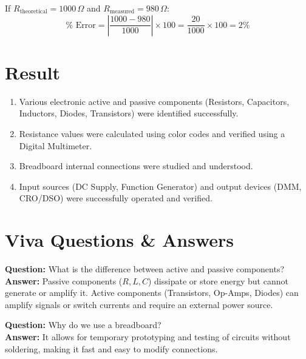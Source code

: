 \begin{example}
If $R_{\text{theoretical}} = 1000\,\Omega$ and $R_{\text{measured}} = 980\,\Omega$:
\begin{equation*}
    \% \text{ Error} = \left| \frac{1000 - 980}{1000} \right| \times 100 = \frac{20}{1000} \times 100 = 2\%
\end{equation*}
\end{example}

\section{Result}
\begin{enumerate}
    \item Various electronic active and passive components (Resistors, Capacitors, Inductors, Diodes, Transistors) were identified successfully.
    \item Resistance values were calculated using color codes and verified using a Digital Multimeter.
    \item Breadboard internal connections were studied and understood.
    \item Input sources (DC Supply, Function Generator) and output devices (DMM, CRO/DSO) were successfully operated and verified.
\end{enumerate}

\section{Viva Questions \& Answers}

\begin{vivaqa}
\textbf{Question:} What is the difference between active and passive components?\\[4pt]
\textbf{Answer:} Passive components ($R, L, C$) dissipate or store energy but cannot generate or amplify it. Active components (Transistors, Op-Amps, Diodes) can amplify signals or switch currents and require an external power source.
\end{vivaqa}

\begin{vivaqa}
\textbf{Question:} Why do we use a breadboard?\\[4pt]
\textbf{Answer:} It allows for temporary prototyping and testing of circuits without soldering, making it fast and easy to modify connections.
\end{vivaqa}

